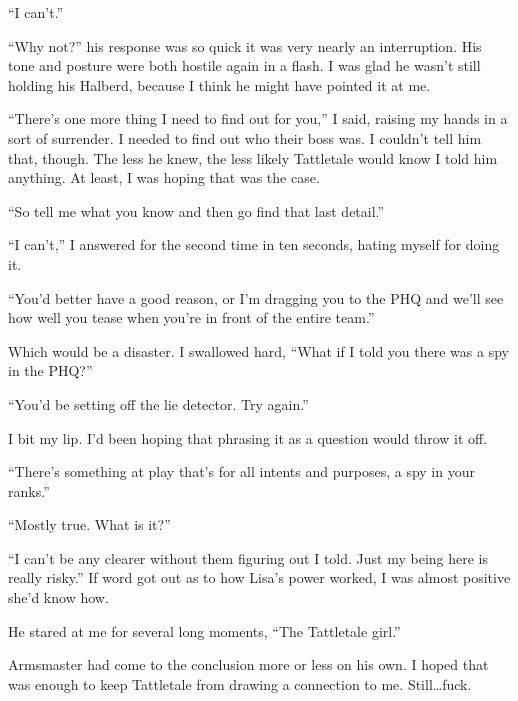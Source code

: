 ``I can't.''



``Why not?'' his response was so quick it was very nearly an interruption.  His tone and posture were both hostile again in a flash.  I was glad he wasn't still holding his Halberd, because I think he might have pointed it at me.



``There's one more thing I need to find out for you,'' I said, raising my hands in a sort of surrender.  I needed to find out who their boss was.  I couldn't tell him that, though.  The less he knew, the less likely Tattletale would know I told him anything.  At least, I was hoping that was the case.



``So tell me what you know and then go find that last detail.''



``I can't,'' I answered for the second time in ten seconds, hating myself for doing it.



``You'd better have a good reason, or I'm dragging you to the PHQ and we'll see how well you tease when you're in front of the entire team.''



Which would be a disaster.  I swallowed hard, ``What if I told you there was a spy in the PHQ?''



``You'd be setting off the lie detector.  Try again.''



I bit my lip.  I'd been hoping that phrasing it as a question would throw it off.



``There's something at play that's for all intents and purposes, a spy in your ranks.''



``Mostly true.  What is it?''



``I can't be any clearer without them figuring out I told.  Just my being here is really risky.''  If word got out as to how Lisa's power worked, I was almost positive she'd know how.



He stared at me for several long moments, ``The Tattletale girl.''



Armsmaster had come to the conclusion more or less on his own.  I hoped that was enough to keep Tattletale from drawing a connection to me.  Still\ldots fuck.



